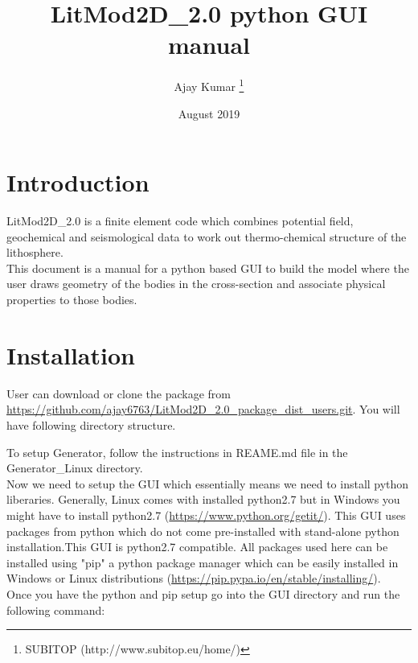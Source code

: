 \documentclass[14pt]{article}
\title{LitMod2D\_2.0 python GUI manual}
\author[1]{Ajay Kumar \thanks{SUBITOP (http://www.subitop.eu/home/)}}
\affil[1]{Group of Dynamics of the Lithosphere, ICTJA-CSIC Barcelona, Spain \\ Email: ajay6763@gmail.com}
\date{August 2019}
\begin{document}
\begin{titlepage}
\maketitle
\end{titlepage}

\section{Introduction}
LitMod2D\_2.0 is a finite element code which combines potential field, geochemical and seismological data to work out thermo-chemical structure of the lithosphere.\\
This document is a manual for a python based GUI to build the model where the user draws geometry of the bodies in the cross-section and associate physical properties to those bodies.

\section{Installation}
User can download or clone the package from \url{https://github.com/ajay6763/LitMod2D_2.0_package_dist_users.git}. You will have following directory structure.
  


To setup Generator, follow the instructions in REAME.md file in the Generator\_Linux directory.\\
Now we need to setup the GUI which essentially means we need to install python liberaries. Generally, Linux comes with installed python2.7 but in Windows you might have to install python2.7 (\url{https://www.python.org/getit/}).
This GUI uses packages from python which do not come pre-installed with stand-alone python installation.This GUI is python2.7 compatible. All packages used here can be installed using "pip" a python package manager which can be easily installed in Windows or Linux distributions (\url{https://pip.pypa.io/en/stable/installing/}).\\

Once you have the python and pip setup go into the GUI directory and run the following command: \\
\end{document}
